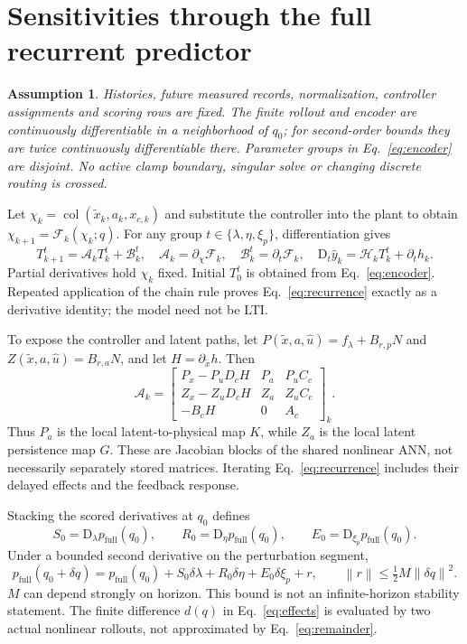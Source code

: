 \documentclass[11pt,a4paper]{article}
\newcommand{\D}{\mathrm D}
\newcommand{\col}{\operatorname{col}}
\newcommand{\norm}[1]{\left\lVert#1\right\rVert}
\newcommand{\full}{\mathrm{full}}
\newtheorem{assumption}[proposition]{Assumption}
\theoremstyle{remark}
\begin{document}
\section{Sensitivities through the full recurrent predictor}\label{sec:sensitivity}
\begin{assumption}\label{ass:smooth}
Histories, future measured records, normalization, controller assignments and scoring rows are fixed. The finite rollout and encoder are continuously differentiable in a neighborhood of $q_0$; for second-order bounds they are twice continuously differentiable there. Parameter groups in Eq.~\eqref{eq:encoder} are disjoint. No active clamp boundary, singular solve or changing discrete routing is crossed.
\end{assumption}
Let $\chi_k=\col(\tilde x_k,a_k,x_{c,k})$ and substitute the controller into the plant to obtain $\chi_{k+1}=\mathcal F_k(\chi_k;q)$. For any group $t\in\{\lambda,\eta,\xi_p\}$, differentiation gives
\begin{equation}\label{eq:recurrence}
 T_{k+1}^{t}=\mathcal A_kT_k^t+\mathcal B_k^t,
 \quad \mathcal A_k=\partial_\chi\mathcal F_k,
 \quad \mathcal B_k^t=\partial_t\mathcal F_k,
 \quad \D_t\hat y_k=\mathcal H_kT_k^t+\partial_t h_k.
\end{equation}
Partial derivatives hold $\chi_k$ fixed. Initial $T_0^t$ is obtained from Eq.~\eqref{eq:encoder}. Repeated application of the chain rule proves Eq.~\eqref{eq:recurrence} exactly as a derivative identity; the model need not be LTI.

To expose the controller and latent paths, let $P(\tilde x,a,\hat u)=f_\lambda+B_{r,p}N$ and $Z(\tilde x,a,\hat u)=B_{r,a}N$, and let $H=\partial_{\tilde x}h$. Then
\begin{equation}\label{eq:jointjac}
 \mathcal A_k=
 \begin{bmatrix}
 P_x-P_uD_cH&P_a&P_uC_c\\
 Z_x-Z_uD_cH&Z_a&Z_uC_c\\
 -B_cH&0&A_c
 \end{bmatrix}_k.
\end{equation}
Thus $P_a$ is the local latent-to-physical map $K$, while $Z_a$ is the local latent persistence map $G$. These are Jacobian blocks of the shared nonlinear ANN, not necessarily separately stored matrices. Iterating Eq.~\eqref{eq:recurrence} includes their delayed effects and the feedback response.

Stacking the scored derivatives at $q_0$ defines
\begin{equation}\label{eq:SRE}
 S_0=\D_\lambda p_\full(q_0),\qquad
 R_0=\D_\eta p_\full(q_0),\qquad
 E_0=\D_{\xi_p}p_\full(q_0).
\end{equation}
Under a bounded second derivative on the perturbation segment,
\begin{equation}\label{eq:remainder}
 p_\full(q_0+\delta q)=p_\full(q_0)+S_0\delta\lambda+R_0\delta\eta+E_0\delta\xi_p+r,
 \qquad \norm r\le\tfrac12 M\norm{\delta q}^2.
\end{equation}
$M$ can depend strongly on horizon. This bound is not an infinite-horizon stability statement. The finite difference $d(q)$ in Eq.~\eqref{eq:effects} is evaluated by two actual nonlinear rollouts, not approximated by Eq.~\eqref{eq:remainder}.
\end{document}
